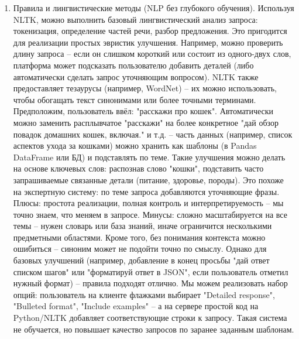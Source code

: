 \begin{enumerate}[label=\arabic*]

\item Правила и лингвистические методы (NLP без глубокого обучения). Используя NLTK, можно выполнить базовый лингвистический анализ запроса: токенизация, определение частей речи, разбор предложения. Это пригодится для реализации простых эвристик улучшения. Например, можно проверить длину запроса – если он слишком короткий или состоит из одного-двух слов, платформа может подсказать пользователю добавить деталей (либо автоматически сделать запрос уточняющим вопросом). NLTK также предоставляет тезаурусы (например, WordNet) – их можно использовать, чтобы обогащать текст синонимами или более точными терминами. Предположим, пользователь ввёл: "расскажи про кошек". Автоматически можно заменить расплывчатое "расскажи" на более конкретное "дай обзор повадок домашних кошек, включая." и т.д. – часть данных (например, список аспектов ухода за кошками) можно хранить как шаблоны (в Pandas DataFrame или БД) и подставлять по теме. Такие улучшения можно делать на основе ключевых слов: распознав слово "кошки", подставить часто запрашиваемые связанные детали (питание, здоровье, породы). Это похоже на экспертную систему: по теме запроса добавляются уточняющие фразы. Плюсы: простота реализации, полная контроль и интерпретируемость – мы точно знаем, что меняем в запросе. Минусы: сложно масштабируется на все темы – нужен словарь или база знаний, иначе ограничится несколькими предметными областями. Кроме того, без понимания контекста можно ошибиться – синоним может не подойти точно по смыслу. Однако для базовых улучшений (например, добавление в конец просьбы "дай ответ списком шагов" или "форматируй ответ в JSON", если пользователь отметил нужный формат) – правила подходят отлично. Мы можем реализовать набор опций: пользователь на клиенте флажками выбирает "Detailed response", "Bulleted format", "Include examples" – а на сервере простой код на Python/NLTK добавляет соответствующие строки к запросу. Такая система не обучается, но повышает качество запросов по заранее заданным шаблонам.


\end{enumerate}
